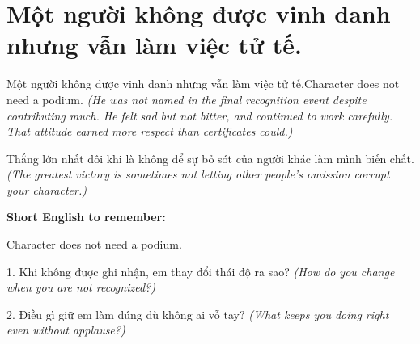 \section{Một người không được vinh danh nhưng vẫn làm việc tử tế.}
\begin{truyen}{Một người không được vinh danh nhưng vẫn làm việc tử tế.}{Character does not need a podium.}
\textit{(He was not named in the final recognition event despite contributing much. He felt sad but not bitter, and continued to work carefully. That attitude earned more respect than certificates could.)}
\end{truyen}
\begin{baihoc}
Thắng lớn nhất đôi khi là không để sự bỏ sót của người khác làm mình biến chất.
\textit{(The greatest victory is sometimes not letting other people's omission corrupt your character.)}
\end{baihoc}
\begin{ghinhoanh}\textbf{Short English to remember:}

Character does not need a podium.
\end{ghinhoanh}
\begin{tuhocnhanh}
1. Khi không được ghi nhận, em thay đổi thái độ ra sao? \textit{(How do you change when you are not recognized?)}

2. Điều gì giữ em làm đúng dù không ai vỗ tay? \textit{(What keeps you doing right even without applause?)}
\end{tuhocnhanh}
\ngancach

